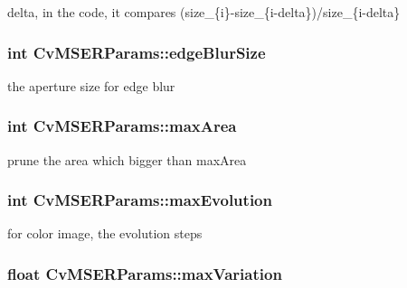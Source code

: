 delta, in the code, it compares (size\-\_\-\{i\}-\/size\-\_\-\{i-\/delta\})/size\-\_\-\{i-\/delta\} 

\hypertarget{structCvMSERParams_a968af0c998169f789c72f7c1320fd029}{
\subsubsection[{edge\-Blur\-Size}]{\setlength{\rightskip}{0pt plus 5cm}int Cv\-M\-S\-E\-R\-Params\-::edge\-Blur\-Size}}\label{structCvMSERParams_a968af0c998169f789c72f7c1320fd029}


the aperture size for edge blur 

\hypertarget{structCvMSERParams_a4f2be25b22dd08ebf741240d9b5a445e}{
\subsubsection[{max\-Area}]{\setlength{\rightskip}{0pt plus 5cm}int Cv\-M\-S\-E\-R\-Params\-::max\-Area}}\label{structCvMSERParams_a4f2be25b22dd08ebf741240d9b5a445e}


prune the area which bigger than max\-Area 

\hypertarget{structCvMSERParams_ae2c65c573f5749809ae5cf426a4bd311}{
\subsubsection[{max\-Evolution}]{\setlength{\rightskip}{0pt plus 5cm}int Cv\-M\-S\-E\-R\-Params\-::max\-Evolution}}\label{structCvMSERParams_ae2c65c573f5749809ae5cf426a4bd311}


for color image, the evolution steps 

\hypertarget{structCvMSERParams_acb769f970c8804c122db9c5dbbc9a37d}{
\subsubsection[{max\-Variation}]{\setlength{\rightskip}{0pt plus 5cm}float Cv\-M\-S\-E\-R\-Params\-::max\-Variation}}\label{structCvMSERParams_acb769f970c8804c122db9c5dbbc9a37d}



